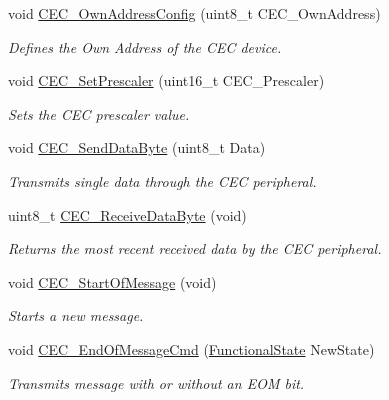 \begin{DoxyCompactItemize}
void \mbox{\hyperlink{group___c_e_c___private___functions_gacad422ef1f50246b2021b41835b8a95c}{C\+E\+C\+\_\+\+Own\+Address\+Config}} (uint8\+\_\+t C\+E\+C\+\_\+\+Own\+Address)
\begin{DoxyCompactList}\small\item\em Defines the Own Address of the C\+EC device. \end{DoxyCompactList}\item 
void \mbox{\hyperlink{group___c_e_c___private___functions_gad2fc626e28a82008a29f062975a9af11}{C\+E\+C\+\_\+\+Set\+Prescaler}} (uint16\+\_\+t C\+E\+C\+\_\+\+Prescaler)
\begin{DoxyCompactList}\small\item\em Sets the C\+EC prescaler value. \end{DoxyCompactList}\item 
void \mbox{\hyperlink{group___c_e_c___private___functions_ga6897ab26d8f909f9160e9fac54b97441}{C\+E\+C\+\_\+\+Send\+Data\+Byte}} (uint8\+\_\+t Data)
\begin{DoxyCompactList}\small\item\em Transmits single data through the C\+EC peripheral. \end{DoxyCompactList}\item 
uint8\+\_\+t \mbox{\hyperlink{group___c_e_c___private___functions_ga165837bff6292e7674eff6f8b230da97}{C\+E\+C\+\_\+\+Receive\+Data\+Byte}} (void)
\begin{DoxyCompactList}\small\item\em Returns the most recent received data by the C\+EC peripheral. \end{DoxyCompactList}\item 
void \mbox{\hyperlink{group___c_e_c___private___functions_ga71e700461ffe7820d9e1c75da65fd0fb}{C\+E\+C\+\_\+\+Start\+Of\+Message}} (void)
\begin{DoxyCompactList}\small\item\em Starts a new message. \end{DoxyCompactList}\item 
void \mbox{\hyperlink{group___c_e_c___private___functions_ga1e2cf6e3a1ac891f2814f9d3f4043574}{C\+E\+C\+\_\+\+End\+Of\+Message\+Cmd}} (\mbox{\hyperlink{group___exported__types_gac9a7e9a35d2513ec15c3b537aaa4fba1}{Functional\+State}} New\+State)
\begin{DoxyCompactList}\small\item\em Transmits message with or without an E\+OM bit. \end{DoxyCompactList}\item 

\end{DoxyCompactItemize}
